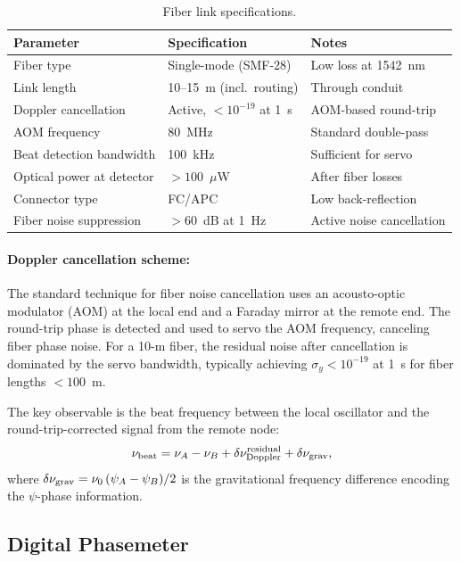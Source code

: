 \documentclass[12pt,letterpaper]{article}
\begin{document}
\begin{table}[h]
\centering
\caption{Fiber link specifications.}
\label{tab:fiber}
\begin{tabular}{@{}lll@{}}
\toprule
Parameter & Specification & Notes \\
\midrule
Fiber type & Single-mode (SMF-28) & Low loss at 1542~nm \\
Link length & 10--15~m (incl.\ routing) & Through conduit \\
Doppler cancellation & Active, $< 10^{-19}$ at 1~s & AOM-based round-trip \\
AOM frequency & 80~MHz & Standard double-pass \\
Beat detection bandwidth & 100~kHz & Sufficient for servo \\
Optical power at detector & $> 100$~$\mu$W & After fiber losses \\
Connector type & FC/APC & Low back-reflection \\
Fiber noise suppression & $> 60$~dB at 1~Hz & Active noise cancellation \\
\bottomrule
\end{tabular}
\end{table}

\paragraph{Doppler cancellation scheme:}
The standard technique for fiber noise cancellation uses an acousto-optic
modulator (AOM) at the local end and a Faraday mirror at the remote end.
The round-trip phase is detected and used to servo the AOM frequency,
canceling fiber phase noise. For a 10-m fiber, the residual noise after
cancellation is dominated by the servo bandwidth, typically achieving
$\sigma_y < 10^{-19}$ at 1~s for fiber lengths $< 100$~m.

The key observable is the beat frequency between the local oscillator and the
round-trip-corrected signal from the remote node:
\begin{equation}
\nu_{\rm beat} = \nu_A - \nu_B + \delta\nu_{\rm Doppler}^{\rm residual}
+ \delta\nu_{\rm grav},
\end{equation}
where $\delta\nu_{\rm grav} = \nu_0\,(\psi_A - \psi_B)/2$ is the
gravitational frequency difference encoding the $\psi$-phase information.

\subsection{Digital Phasemeter}
\end{document}
